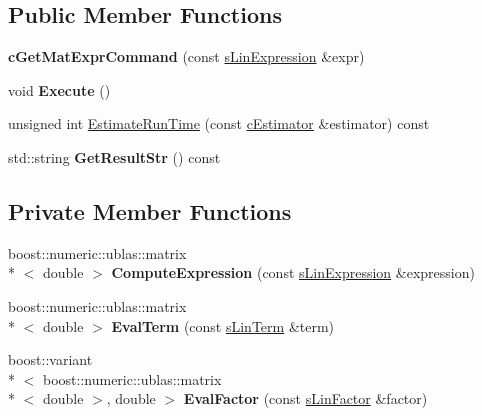 \subsection*{Public Member Functions}
\begin{DoxyCompactItemize}
\item 
\hypertarget{classengine_1_1cGetMatExprCommand_a5aa0b4ea3da91ed9b9438b12e409ecd7}{{\bfseries c\-Get\-Mat\-Expr\-Command} (const \hyperlink{structengine_1_1sLinExpression}{s\-Lin\-Expression} \&expr)}\label{classengine_1_1cGetMatExprCommand_a5aa0b4ea3da91ed9b9438b12e409ecd7}

\item 
\hypertarget{classengine_1_1cGetMatExprCommand_a29cf2191f93572f0d08f5515a7e0c499}{void {\bfseries Execute} ()}\label{classengine_1_1cGetMatExprCommand_a29cf2191f93572f0d08f5515a7e0c499}

\item 
unsigned int \hyperlink{classengine_1_1cGetMatExprCommand_a6a9c787618267539be3004983c3d1747}{Estimate\-Run\-Time} (const \hyperlink{classengine_1_1cEstimator}{c\-Estimator} \&estimator) const 
\item 
\hypertarget{classengine_1_1cGetMatExprCommand_aa4f9644e8f454fe1df9273407923c188}{std\-::string {\bfseries Get\-Result\-Str} () const }\label{classengine_1_1cGetMatExprCommand_aa4f9644e8f454fe1df9273407923c188}

\end{DoxyCompactItemize}
\subsection*{Private Member Functions}
\begin{DoxyCompactItemize}
\item 
\hypertarget{classengine_1_1cGetMatExprCommand_aa431ea9a285f1b726ba52310cf02d44c}{boost\-::numeric\-::ublas\-::matrix\\*
$<$ double $>$ {\bfseries Compute\-Expression} (const \hyperlink{structengine_1_1sLinExpression}{s\-Lin\-Expression} \&expression)}\label{classengine_1_1cGetMatExprCommand_aa431ea9a285f1b726ba52310cf02d44c}

\item 
\hypertarget{classengine_1_1cGetMatExprCommand_a92259fad9fd3c414abe9dbb96404da40}{boost\-::numeric\-::ublas\-::matrix\\*
$<$ double $>$ {\bfseries Eval\-Term} (const \hyperlink{structengine_1_1sLinTerm}{s\-Lin\-Term} \&term)}\label{classengine_1_1cGetMatExprCommand_a92259fad9fd3c414abe9dbb96404da40}

\item 
\hypertarget{classengine_1_1cGetMatExprCommand_a8a8fe7554ec834973ff91bbeb87c2296}{boost\-::variant\\*
$<$ boost\-::numeric\-::ublas\-::matrix\\*
$<$ double $>$, double $>$ {\bfseries Eval\-Factor} (const \hyperlink{structengine_1_1sLinFactor}{s\-Lin\-Factor} \&factor)}\label{classengine_1_1cGetMatExprCommand_a8a8fe7554ec834973ff91bbeb87c2296}

\end{DoxyCompactItemize}
